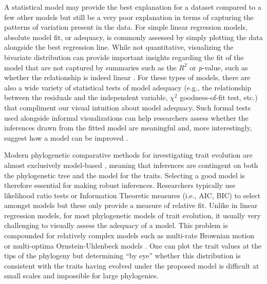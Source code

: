 A statistical model may provide the best explanation for a dataset compared to a few other models but still be a very poor explanation in terms of capturing the patterns of variation present in the data. For simple linear regression models, absolute model fit, or adequacy, is commonly assessed by simply plotting the data alongside the best regression line. While not quantitative, visualizing the bivariate distribution can provide important insights regarding the fit of the model that are not captured by summaries such as the $R^2$ or \emph{p}-value, such as whether the relationship is indeed linear \citep[for a classic case study, see][]{anscombe1973}. For these types of models, there are also a wide variety of statistical tests of model adequacy (e.g., the relationship between the residuals and the independent variable, $\chi^2$ goodness-of-fit test, etc.) that compliment our visual intuition about model adequacy. Such formal tests used alongside informal visualizations can help researchers assess whether the inferences drawn from the fitted model are meaningful and, more interestingly, suggest how a model can be improved \citep{Gelman2012}.

Modern phylogenetic comparative methods for investigating trait evolution are almost exclusively model-based \citep[recently reviewed in][]{Omeara2012, PennellHarmon}, meaning that inferences are contingent on both the phylogenetic tree and the model for the traits. Selecting a good model is therefore essential for making robust inferences. Researchers typically use likelihood ratio tests or Information Theoretic measures (i.e., AIC, BIC) to select amongst models \citep{Mooers1999, Harmon2010, Hunt2012} but these only provide a measure of relative fit. Unlike in linear regression models, for most phylogenetic models of trait evolution, it usually very challenging to visually assess the adequacy of a model. This problem is compounded for relatively complex models such as multi-rate Brownian motion \citep{Omeara2006, Eastman2011} or multi-optima Ornstein-Uhlenbeck models \citep{Hansen1997, ButlerKing2004, Beaulieu2012, UyedaBayou}. One can plot the trait values at the tips of the phylogeny but determining ``by eye'' whether this distribution is consistent with the traits having evolved under the proposed model is difficult at small scales and impossible for large phylogenies.

